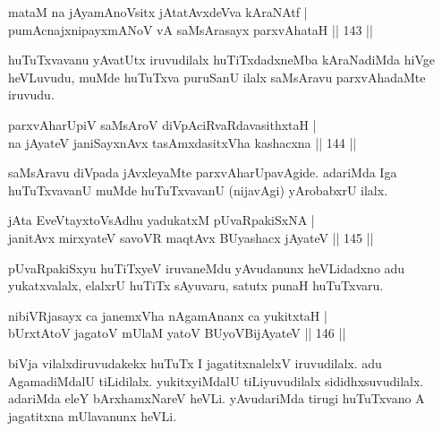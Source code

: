 
\begin{shl}
mataM na jAyamAnoV\s sitx jAtatAvxdeVva kAraNAtf |\\
pumAcnajxnipayxmANoV vA saMsArasayx parxvAhataH \hfill || 143 ||
\end{shl}

\begin{artha}
huTuTxvavanu yAvatUtx iruvudilalx huTiTxdadxneMba kAraNadiMda hiVge heVLuvudu, muMde huTuTxva puruSanU ilalx saMsAravu parxvAhadaMte iruvudu.
\end{artha}

\begin{shl}
parxvAharUpiV saMsAroV diVpAciRvaRdavasithxtaH |\\
na jAyateV janiSayxnAvx tasAmxdasitxVha kashacxna \hfill || 144 ||
\end{shl}

\begin{artha}
saMsAravu diVpada jAvxleyaMte parxvAharUpavAgide. adariMda Iga huTuTxvavanU muMde huTuTxvavanU (nijavAgi) yArobabxrU ilalx.
\end{artha}%


\begin{shl}
jAta EveVtayxtoV\s sAdhu yadukatxM pUvaRpakiSxNA |\\
janitAvx mirxyateV savoVR maqtAvx BUyashacx jAyateV \hfill || 145 ||
\end{shl}

\begin{artha}
pUvaRpakiSxyu huTiTxyeV iruvaneMdu yAvudanunx heVLidadxno adu yukatxvalalx, elalxrU huTiTx sAyuvaru, satutx punaH huTuTxvaru.
\end{artha}


\begin{shl}
nibiVRjasayx ca janemxVha nA\s \s gamAnanx ca yukitxtaH |\\
bUrxtAtoV jagatoV mUlaM yatoV BUyoV\s BijAyateV \hfill || 146 ||
\end{shl}

\begin{artha}
biVja vilalxdiruvudakekx huTuTx I jagatitxnalelxV iruvudilalx. adu AgamadiMdalU tiLidilalx. yukitxyiMdalU tiLiyuvudilalx sididhxsuvudilalx. adariMda eleY bArxhamxNareV heVLi. yAvudariMda tirugi huTuTxvano A jagatitxna mUlavanunx heVLi.
\end{artha}

